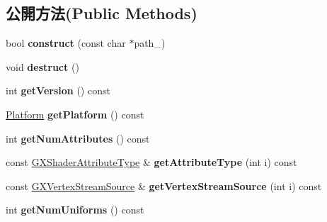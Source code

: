 \subsection*{公開方法(Public Methods)}
\begin{DoxyCompactItemize}
\item 
bool {\bfseries construct} (const char $\ast$path\+\_\+)\hypertarget{class_i_dream_sky_1_1_visual_effect_a5e2a540177bacc1d3f6c787bfd30871c}{}\label{class_i_dream_sky_1_1_visual_effect_a5e2a540177bacc1d3f6c787bfd30871c}

\item 
void {\bfseries destruct} ()\hypertarget{class_i_dream_sky_1_1_visual_effect_a5ee964eb71ea32b1102215ea829e1ef2}{}\label{class_i_dream_sky_1_1_visual_effect_a5ee964eb71ea32b1102215ea829e1ef2}

\item 
int {\bfseries get\+Version} () const \hypertarget{class_i_dream_sky_1_1_visual_effect_a0a40425cee2002bd62ad3de40e45ffa8}{}\label{class_i_dream_sky_1_1_visual_effect_a0a40425cee2002bd62ad3de40e45ffa8}

\item 
\hyperlink{class_i_dream_sky_1_1_platform}{Platform} {\bfseries get\+Platform} () const \hypertarget{class_i_dream_sky_1_1_visual_effect_a2dc0c7cbd7aa0872216f28c9b5f2dc9f}{}\label{class_i_dream_sky_1_1_visual_effect_a2dc0c7cbd7aa0872216f28c9b5f2dc9f}

\item 
int {\bfseries get\+Num\+Attributes} () const \hypertarget{class_i_dream_sky_1_1_visual_effect_afd5d7998b37431fbb54bd3e3f7262334}{}\label{class_i_dream_sky_1_1_visual_effect_afd5d7998b37431fbb54bd3e3f7262334}

\item 
const \hyperlink{class_i_dream_sky_1_1_g_x_shader_attribute_type}{G\+X\+Shader\+Attribute\+Type} \& {\bfseries get\+Attribute\+Type} (int i) const \hypertarget{class_i_dream_sky_1_1_visual_effect_a06a192c01a6328ee2e22579347297fdf}{}\label{class_i_dream_sky_1_1_visual_effect_a06a192c01a6328ee2e22579347297fdf}

\item 
const \hyperlink{class_i_dream_sky_1_1_g_x_vertex_stream_source}{G\+X\+Vertex\+Stream\+Source} \& {\bfseries get\+Vertex\+Stream\+Source} (int i) const \hypertarget{class_i_dream_sky_1_1_visual_effect_aae5a0f4d63258f2d999a584c07d1013e}{}\label{class_i_dream_sky_1_1_visual_effect_aae5a0f4d63258f2d999a584c07d1013e}

\item 
int {\bfseries get\+Num\+Uniforms} () const \hypertarget{class_i_dream_sky_1_1_visual_effect_a8f86ce863718c8e062a76a024b29140b}{}\label{class_i_dream_sky_1_1_visual_effect_a8f86ce863718c8e062a76a024b29140b}


\end{DoxyCompactItemize}
